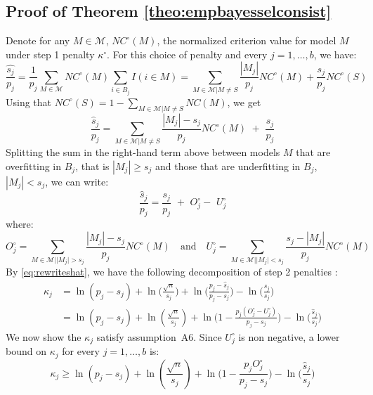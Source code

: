 \documentclass[aos]{imsart}
\theoremstyle{plain}
\begin{document}
\begin{supplement}
\subsection{Proof of Theorem \ref{theo:empbayesselconsist}}
Denote for any $M\in\mathcal{M}$, $NC^{\circ}(M)$, the normalized criterion value for model $M$ under step 1 penalty $\kappa^{\circ}$. For this choice of penalty and every $j=1,\ldots,b$, we have:
\begin{equation*}
    \frac{\widehat{s_j}}{p_j}
   = \frac{1}{p_j}\sum_{M \in \mathcal{M}}NC^{\circ}(M)\sum_{i \in B_j}I(i\in M) =\sum_{M \in \mathcal{M} | M \neq S}\frac{|M_j|}{p_j}NC^{\circ}(M) +\frac{s_j}{p_j}NC^{\circ}(S) 
\end{equation*}
Using that $NC^{\circ}(S)=1-\sum_{M \in \mathcal{M} | M \neq S}NC(M)$, we get
\begin{equation*}
   \frac{\widehat{s}_j}{p_j}
   =\sum_{M \in \mathcal{M} | M \neq S}\frac{|M_j|-s_j}{p_j}NC^{\circ}(M) \,\,+\,\, \frac{s_j}{p_j}
\end{equation*}
Splitting the sum in the right-hand term above between models $M$ that are overfitting in $B_j$, that is $|M_j|\geq s_j$ and those that are underfitting in $B_j$, $|M_j|<s_j$, we can write:
\begin{equation}\label{eq:rewriteshat}
  \frac{\widehat{s}_j}{p_j}  = \frac{s_j}{p_j}\,\,+\,\, O_j^{\circ}-\,\,U_j^{\circ}  
\end{equation}
where:
$$
    O_j^{\circ} = \sum_{M \in \mathcal{M} | |M_j| > s_j}\frac{|M_j|-s_j}{p_j}NC^{\circ}(M)\quad\text{and}\quad
    U_j^{\circ} = \sum_{M \in \mathcal{M} | |M_j| < s_j}\frac{s_j-|M_j|}{p_j}NC^{\circ}(M)
$$
By \eqref{eq:rewriteshat}, we have the following decomposition of step 2 penalties :
\begin{align}\label{eq:decompstep2pen}
    \kappa_j
    &= \ln(p_j-s_j) + \ln\Big(\frac{\sqrt{n}}{s_j}\Big) + \ln\Big(\frac{p_j-\widehat{s}_j}{p_j-s_j}\Big) - \ln\Big(\frac{\widehat{s}_j}{s_j}\Big) \nonumber\\
    &= \ln(p_j-s_j)+\ln(\frac{\sqrt{n}}{s_j})+\ln\Big(1-\frac{p_j(O^{\circ}_j-U^{\circ}_j)}{p_j-s_j}\Big)-\ln\Big(\frac{\widehat{s}_j}{s_j}\Big)
\end{align}
We now show the $\kappa_j$ satisfy assumption~A6. Since $U_j^{\circ}$ is non negative, a lower bound on $\kappa_j$ for every $j=1,\ldots,b$ is:
\begin{equation*}
    \kappa_j
    \geq  \ln(p_j-s_j)+\ln(\frac{\sqrt{n}}{s_j})+\ln\Big(1-\frac{p_j O^{\circ}_j}{p_j-s_j}\Big)-\ln\Big(\frac{\widehat{s}_j}{s_j}\Big)

\end{equation*}
\end{supplement}
\end{document}
